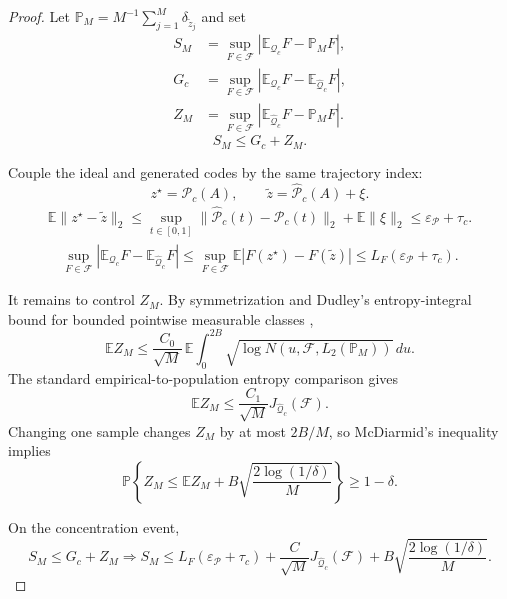 \documentclass[preprint,12pt,number]{elsarticle}
\begin{document}
\begin{proof}
	Let $\mathbb{P}_M=M^{-1}\sum_{j=1}^{M}\delta_{\tilde z_j}$ and set
	\[
	\begin{aligned}
	S_M&=
	\sup_{F\in\mathcal{F}}
	\left|
	\mathbb{E}_{\mathcal{Q}_c}F-\mathbb{P}_M F
	\right|,\\
	G_c&=
	\sup_{F\in\mathcal{F}}
	\left|
	\mathbb{E}_{\mathcal{Q}_c}F-\mathbb{E}_{\widehat{\mathcal{Q}}_c}F
	\right|,\\
	Z_M&=
	\sup_{F\in\mathcal{F}}
	\left|
	\mathbb{E}_{\widehat{\mathcal{Q}}_c}F-\mathbb{P}_M F
	\right|.
	\end{aligned}
	\]
	\[
	S_M\le G_c+Z_M .
	\]

	Couple the ideal and generated codes by the same trajectory index:
	\[
	z^\star=\mathcal{P}_c(A),\qquad
	\tilde z=\widehat{\mathcal{P}}_c(A)+\xi .
	\]
	\[
	\begin{aligned}
		\mathbb{E}\lVert z^\star-\tilde z\rVert_2
		\le
		\sup_{t\in[0,1]}
		\lVert\widehat{\mathcal{P}}_c(t)-\mathcal{P}_c(t)\rVert_2
		+
		\mathbb{E}\lVert\xi\rVert_2
		\le
		\varepsilon_{\mathcal{P}}+\tau_c .
	\end{aligned}
	\]
	\[
	\begin{aligned}
		\sup_{F\in\mathcal{F}}
		\left|
		\mathbb{E}_{\mathcal{Q}_c}F-
		\mathbb{E}_{\widehat{\mathcal{Q}}_c}F
		\right|
		\le
		\sup_{F\in\mathcal{F}}
		\mathbb{E}\left|F(z^\star)-F(\tilde z)\right|
			\le
			L_F(\varepsilon_{\mathcal{P}}+\tau_c).
	\end{aligned}
	\]

	It remains to control $Z_M$. By symmetrization and Dudley's entropy-integral bound for bounded pointwise measurable classes \citep{dudley1967sizes, vandervaart1996weak, wainwright2019high},
	\[
	\mathbb{E}Z_M
	\le
	\frac{C_0}{\sqrt{M}}\,
	\mathbb{E}
	\int_0^{2B}
	\sqrt{\log N(u,\mathcal{F},L_2(\mathbb{P}_M))}\,du .
	\]
	The standard empirical-to-population entropy comparison gives
	\[
	\mathbb{E}Z_M
	\le
	\frac{C_1}{\sqrt{M}}J_{\widehat{\mathcal{Q}}_c}(\mathcal{F}).
	\]
	Changing one sample changes $Z_M$ by at most $2B/M$, so McDiarmid's inequality implies
	\[
	\mathbb{P}\left\{
		Z_M
		\le
		\mathbb{E}Z_M
		+
		B\sqrt{\frac{2\log(1/\delta)}{M}}
	\right\}
	\ge
	1-\delta .
	\]

	On the concentration event,
	\[
	S_M\le G_c+Z_M
	\Longrightarrow
	S_M
	\le
	L_F(\varepsilon_{\mathcal{P}}+\tau_c)
	+
	\frac{C}{\sqrt{M}}J_{\widehat{\mathcal{Q}}_c}(\mathcal{F})
	+
	B\sqrt{\frac{2\log(1/\delta)}{M}} .
	\]
\end{proof}
\end{document}
